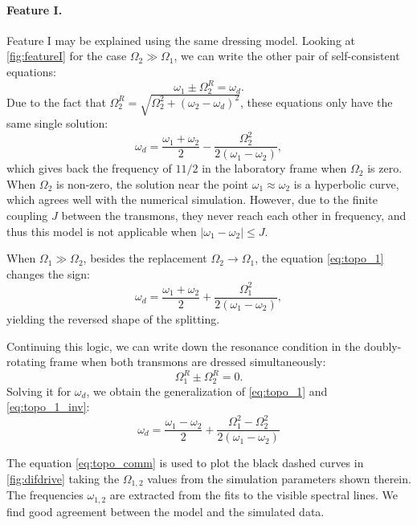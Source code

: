 \documentclass[%
 aip,
 amsmath,amssymb,
 reprint,%
]{revtex4-1}
\begin{document}
\paragraph{Feature I.} Feature I may be explained using the same dressing model. Looking at \autoref{fig:featureI} for the case $\Omega_2 \gg \Omega_1$, we can write the other pair of self-consistent equations:
\begin{equation}
\omega_{1} \pm \Omega_2^R = \omega_d.
\end{equation}
Due to the fact that $\Omega_2^R = \sqrt{\Omega_2^2 + (\omega_2 - \omega_d)^2}$, these equations only have the same single solution:
\begin{equation}
\omega_d = \frac{\omega_1 + \omega_2}{2} - \frac{ \Omega_{2}^{2}}{2 \left(\omega_{1} - \omega_{2}\right)},
\label{eq:topo_1}
\end{equation}
which gives back the frequency of $11/2$ in the laboratory frame when $\Omega_2$ is zero. When $\Omega_2$ is non-zero, the solution near the point $\omega_1 \approx \omega_2$ is a hyperbolic curve, which agrees well with the numerical simulation. However, due to the finite coupling $J$ between the transmons, they never reach each other in frequency, and thus this model is not applicable when $|\omega_1 - \omega_2| \leq J$.

When $\Omega_1 \gg \Omega_2$, besides the replacement $\Omega_2 \rightarrow \Omega_1$, the equation \eqref{eq:topo_1} changes the sign:
\begin{equation}
\omega_d = \frac{\omega_1 + \omega_2}{2} + \frac{ \Omega_{1}^{2}}{2 \left(\omega_{1} - \omega_{2}\right)},
\label{eq:topo_1_inv}
\end{equation}
yielding the reversed shape of the splitting.

Continuing this logic, we can write down the resonance condition in the doubly-rotating frame when both transmons are dressed simultaneously:
\begin{equation}
\Omega_1^R \pm \Omega_2^R = 0.
\end{equation}
Solving it for $\omega_d$, we obtain the generalization of \eqref{eq:topo_1} and \eqref{eq:topo_1_inv}:
\begin{equation}
\omega_d = \frac{\omega_{1} - \omega_{2}}{2} + \frac{\Omega_{1}^{2} - \Omega_{2}^{2}}{ 2\left(\omega_{1} - \omega_{2}\right)}
\label{eq:topo_comm}
\end{equation}

The equation \eqref{eq:topo_comm} is used to plot the black dashed curves in \autoref{fig:difdrive} taking the $\Omega_{1,2}$ values from the simulation parameters shown therein. The frequencies $\omega_{1,2}$ are extracted from the fits to the visible spectral lines. We find good agreement between the model and the simulated data.
\end{document}
